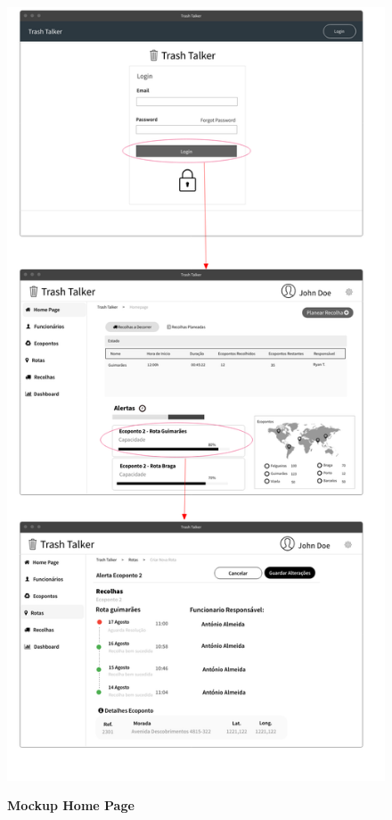 \documentclass{scrreprt}
\begin{document}
	\begin{figure}[H]
		\centering
		\includegraphics[scale=.30]{imagens/MockupHomepage}
		\par \textbf{Mockup Home Page}
		\label{fig:MockupHomepage}
	\end{figure}
\end{document}
